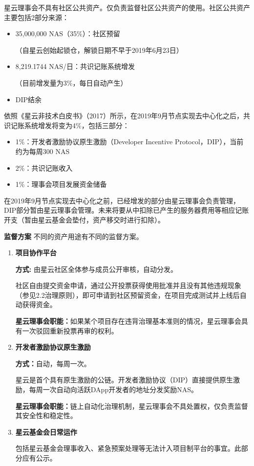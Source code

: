 星云理事会不具有社区公共资产。仅负责监督社区公共资产的使用。社区公共资产主要包括2部分来源：
\begin{itemize}
	\item 35,000,000 NAS（35\%）：社区预留

	（自星云创始起锁仓，解锁日期不早于2019年6月23日）
    \item 8,219.1744 NAS/日：共识记账系统增发
    
    （目前增发量为3\%，每日自动产生）

	\item DIP结余
\end{itemize}
依照《星云非技术白皮书》（2017）所示，在2019年9月节点实现去中心化之后，共识记账系统增发将变为4\%，包括三部分：
\begin{itemize}
	\item 1\%：开发者激励协议原生激励（Developer Incentive Protocol，DIP），当前约为每周300 NAS
	\item 2\%：共识记账收入
	\item 1\%：理事会项目发展资金储备
\end{itemize}
在2019年9月节点实现去中心化之前，已经增发的部分由星云理事会负责管理，DIP部分暂由星云理事会管理。未来将要从中扣除已产生的服务器费用等相应记账开支（暂由星云基金会垫付，资产移交时进行扣除）。

\textbf{监督方案}
不同的资产用途有不同的监督方案。
\begin{enumerate}
	\item \textbf{项目协作平台}
	
	\textbf{方式:} 由星云社区全体参与成员公开审核，自动分发。
	
	社区自由提交资金申请，通过公开投票获得使用批准并且没有其他违规现象（参见2.2治理原则），即可申请到社区预留资金，在项目完成测试并上线后自动获得资金。
	
	\textbf{星云理事会职能：}如果某个项目存在违背治理基本准则的情况，星云理事会具有一次驳回重新投票再审的权利。
	
	\item \textbf{开发者激励协议原生激励}
	
	\textbf{方式：}自动，每周一次。
	
	星云是首个具有原生激励的公链。开发者激励协议（DIP）直接提供原生激励，每周一次自动向活跃DApp开发者的地址分发奖励NAS。
	
	\textbf{星云理事会职能：}链上自动化治理机制，星云理事会不具处置权，仅负责监督其安全性和稳定性。
	
	\item \textbf{星云基金会日常运作}
	
	包括星云基金会理事收入、紧急预案处理等无法计入项目制平台的事宜。此部分应有公示。
\end{enumerate}

